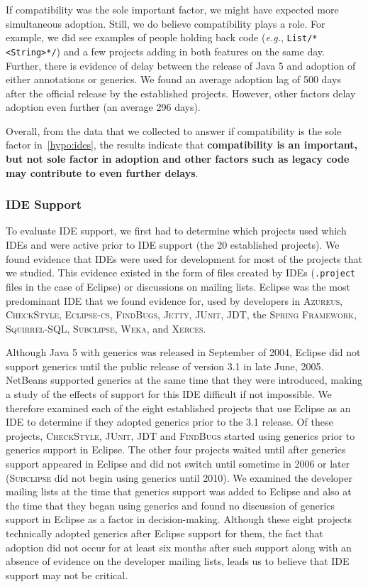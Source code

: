\documentclass{svjour3}
\newcommand{\code}[1]{\texttt{#1}}
\newcommand{\squirrelsql}{\textsc{Squirrel-SQL}\xspace}
\newcommand{\eclipsecs}{\textsc{Eclipse-cs}\xspace}
\newcommand{\azureus}{\textsc{Azureus}\xspace}
\newcommand{\spring}{the \textsc{Spring Framework}\xspace}
\newcommand{\junit}{\textsc{JUnit}\xspace}
\newcommand{\jdt}{\textsc{JDT}\xspace}
\newcommand{\weka}{\textsc{Weka}\xspace}
\newcommand{\findbugs}{\textsc{FindBugs}\xspace}
\newcommand{\checkstyle}{\textsc{CheckStyle}\xspace}
\newcommand{\xerces}{\textsc{Xerces}\xspace}
\newcommand{\jetty}{\textsc{Jetty}\xspace}
\newcommand{\subclipse}{\textsc{Subclipse}\xspace}
\begin{document}
\smallskip
If compatibility was the sole important factor, we might have expected more simultaneous adoption.
Still, we do believe compatibility plays a role.  For example, we did see examples of people holding back code (\emph{e.g.}, \texttt{List/*<String>*/}) and a few projects adding in both features 
on the same day.  Further, there is evidence of delay between the release of Java 5 and adoption of either annotations or generics. 
We found an average adoption lag of 500 days after the official release by the established projects.
However, other factors delay adoption even further (an average 296 days).

Overall, from the data that we collected to answer if compatibility is the sole factor in~\autoref{hypo:ides}, 
the results indicate that \textbf{compatibility is an important, but not sole factor in adoption and other factors such as legacy code may contribute to even further delays}.

\subsubsection{IDE Support}

To evaluate IDE support, we first had to determine which projects used
which IDEs and were active prior to IDE support (the 20 established projects).  
We found evidence that IDEs were used for development for most of the projects that we studied.  This
evidence existed in the form of files created by IDEs (\code{.project} files in
the case of Eclipse) or discussions on mailing lists.  Eclipse was the most
predominant IDE that we found evidence for, used by developers in
\azureus, \checkstyle, \eclipsecs, \findbugs, \jetty, \junit, \jdt,
\spring, \squirrelsql, \subclipse, \weka, and \xerces.

Although Java 5 with generics was released in September of 2004, Eclipse
did not support generics until the public release of version 3.1 in late June,
2005.  NetBeans supported generics at the same time that they were introduced, making a study of the
effects of support for this IDE difficult if not impossible.
We therefore examined each of the eight established projects that use Eclipse as an IDE to
determine if they adopted generics prior to the 3.1 release.  Of these
projects, \checkstyle, \junit, \jdt and \findbugs started using generics prior
to generics support in Eclipse.  The other four projects waited until
after generics support appeared in Eclipse and did not switch until sometime in 2006 or later (\subclipse
did not begin using generics until 2010).  We examined the developer mailing lists at the time
that generics support was added to Eclipse and also at the time that they began using generics
and found no discussion of generics support in Eclipse as a factor in decision-making.
Although these eight projects technically adopted generics after Eclipse support for them,
the fact that adoption did not occur for at least six months after such support along
with an absence of evidence on the developer mailing lists, leads us to believe that IDE support
may not be critical.
\end{document}
